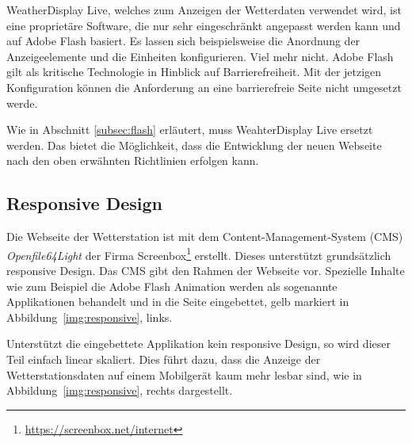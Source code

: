 \noindent
WeatherDisplay Live, welches zum Anzeigen der Wetterdaten verwendet wird, ist eine proprietäre Software, die nur sehr eingeschränkt angepasst werden kann und auf Adobe Flash basiert. Es lassen sich beispielsweise die Anordnung der Anzeigeelemente und die Einheiten konfigurieren. Viel mehr nicht.  Adobe Flash gilt als kritische Technologie in Hinblick auf Barrierefreiheit. Mit der jetzigen Konfiguration können die Anforderung an eine barrierefreie Seite nicht umgesetzt werde.
\newline

\noindent
Wie in Abschnitt \ref{subsec:flash} erläutert, muss WeahterDisplay Live ersetzt werden. Das bietet die Möglichkeit, dass die Entwicklung der neuen Webseite nach den oben erwähnten Richtlinien erfolgen kann.


\subsection{Responsive Design}
Die Webseite der Wetterstation ist mit dem Content-Management-System (CMS) \textit{Openfile64Light} der Firma Screenbox\footnote{ \url{https://screenbox.net/internet}}  erstellt. Dieses unterstützt grundsätzlich responsive Design. Das CMS gibt den Rahmen der Webseite vor. Spezielle Inhalte wie zum Beispiel die Adobe Flash Animation werden als sogenannte Applikationen behandelt und in die Seite eingebettet, gelb markiert in Abbildung~\ref{img:responsive}, links.
\newline

\noindent
Unterstützt die eingebettete Applikation kein responsive Design, so wird dieser Teil einfach linear skaliert. Dies führt dazu, dass die Anzeige der Wetterstationsdaten auf einem Mobilgerät kaum mehr lesbar sind, wie in Abbildung~\ref{img:responsive}, rechts dargestellt.
\newline

